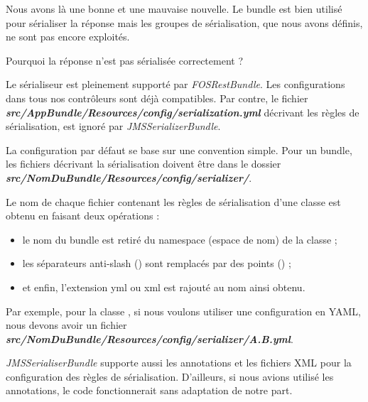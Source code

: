 \documentclass[big]{zmdocument}
\begin{document}
Nous avons là une bonne et une mauvaise nouvelle. Le bundle est bien utilisé pour sérialiser la réponse mais les groupes de sérialisation, que nous avons définis, ne sont pas encore exploités.



\begin{Question}
Pourquoi la réponse n'est pas sérialisée correctement ?
\end{Question}


Le sérialiseur est pleinement supporté par \textit{FOSRestBundle}. Les configurations dans tous nos contrôleurs sont déjà compatibles.
Par contre, le fichier \textbf{\textit{src/AppBundle/Resources/config/serialization.yml}} décrivant les règles de sérialisation, est ignoré par \textit{JMSSerializerBundle}.



La configuration par défaut se base sur une convention simple. Pour un bundle, les fichiers décrivant la sérialisation doivent être dans le dossier \textbf{\textit{src/NomDuBundle/Resources/config/serializer/}}.



Le nom de chaque fichier contenant les règles de sérialisation d'une classe est obtenu en faisant deux opérations :



\begin{itemize}
\item le nom du bundle est retiré du namespace (espace de nom) de la classe ;
\item les séparateurs anti-slash (\CodeInline{\textbackslash{}}) sont remplacés par des points () ;
\item et enfin, l'extension yml ou xml est rajouté au nom ainsi obtenu.
\end{itemize}


Par exemple, pour la classe , si nous voulons utiliser une configuration en YAML, nous devons avoir un fichier \textbf{\textit{src/NomDuBundle/Resources/config/serializer/A.B.yml}}.



\begin{Information}
\textit{JMSSerialiserBundle} supporte aussi les annotations et les fichiers XML pour la configuration des règles de sérialisation. D'ailleurs, si nous avions utilisé les annotations, le code fonctionnerait sans adaptation de notre part.
\end{Information}
\end{document}
